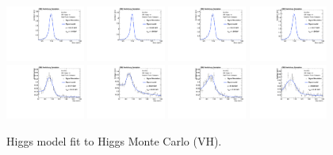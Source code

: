 \begin{figure}[h]
  \centering
\includegraphics[width=0.23\textwidth]{figures/sec-signals/HiggsShapes/vh_HM_signal_fit_mgg_cat0.pdf}
\includegraphics[width=0.23\textwidth]{figures/sec-signals/HiggsShapes/vh_HM_signal_fit_mgg_cat1.pdf}
\includegraphics[width=0.23\textwidth]{figures/sec-signals/HiggsShapes/vh_LM_signal_fit_mgg_cat0.pdf}
\includegraphics[width=0.23\textwidth]{figures/sec-signals/HiggsShapes/vh_LM_signal_fit_mgg_cat1.pdf}
\includegraphics[width=0.23\textwidth]{figures/sec-signals/HiggsShapes/vh_HM_signal_fit_mjj_cat0.pdf}
\includegraphics[width=0.23\textwidth]{figures/sec-signals/HiggsShapes/vh_HM_signal_fit_mjj_cat1.pdf}
\includegraphics[width=0.23\textwidth]{figures/sec-signals/HiggsShapes/vh_LM_signal_fit_mjj_cat0.pdf}
\includegraphics[width=0.23\textwidth]{figures/sec-signals/HiggsShapes/vh_LM_signal_fit_mjj_cat1.pdf}
  \caption{Higgs model fit to Higgs Monte Carlo (VH).}
  \label{fig:higgs_fit_vh}
\end{figure}

